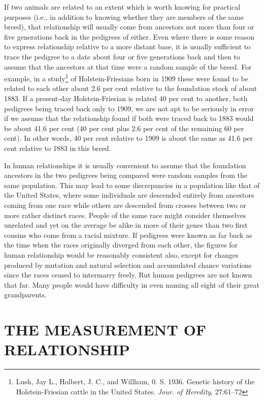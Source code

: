 If two animals are related to an extent which is worth knowing for
practical purposes (i.e., in addition to knowing whether they are members
of the same breed), that relationship will usually come from ancestors
not more than four or five generations back in the pedigrees of
either. Even where there is some reason to express relationship relative
to a more distant base, it is usually sufficient to trace the pedigree to a
date about four or five generations back and then to assume that the
ancestors at that time were a random sample of the breed. For example,
in a study\footnote{Lush, Jay L., Holbert, J. C., and Willham, 0. S. 1936.
Genetic history of the Holstein-Friesian cattle in the United States.
\textit{Jour. of Heredity}, 27:61--72} of Holstein-Friesians born in 1909
these were found to be related to each other about 2.6 per cent relative to
the foundation stock of about 1883. If a present-day Holstein-Friesian is
related 40 per cent to another, both pedigrees being traced back only to
1909, we are not apt to be seriously in error if we assume that the
relationship found if both were traced back to 1883 would be about 41.6 per 
cent (40 per cent plus 2.6 per cent of the remaining 60 per cent). In other
words, 40 per cent relative to 1909 is about the same as 41.6 per cent
relative to 1883 in this breed.

In human relationships it is usually convenient to assume that the
foundation ancestors in the two pedigrees being compared were random
samples from the same population. This may lead to some discrepancies
in a population like that of the United States, where some
individuals are descended entirely from ancestors coming from one race
while others are descended from crosses between two or more rather distinct
races. People of the same race might consider themselves unrelated
and yet on the average be alike in more of their genes than two first
cousins who come from a racial mixture. If pedigrees were known as far
back as the time when the races originally diverged from each other, the
figures for human relationship would be reasonably consistent also,
except for changes produced by mutation and natural selection and
accumulated chance variations since the races ceased to intermarry
freely. Rut human pedigrees are not known that far. Many people
would have difficulty in even naming all eight of their great grandparents.

\section*{THE MEASUREMENT OF RELATIONSHIP}

